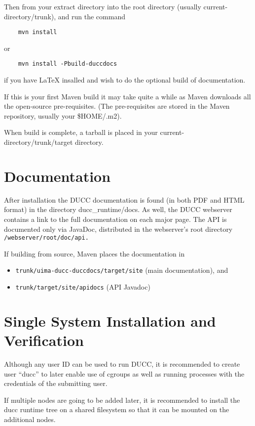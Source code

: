 Then from your extract directory into
the root directory (usually current-directory/trunk), and run the command
\begin{verbatim}
    mvn install
\end{verbatim}
or
\begin{verbatim}
    mvn install -Pbuild-duccdocs
\end{verbatim}
if you have LaTeX insalled and wish to do the optional build of documentation.

If this is your first Maven build it may take quite a while as Maven downloads all the
open-source pre-requisites.  (The pre-requisites are stored in the Maven repository, usually
your \$HOME/.m2).

When build is complete, a tarball is placed in your current-directory/trunk/target
directory.

\section{Documentation}
\begin{sloppypar}
After installation the DUCC documentation is found (in both PDF and HTML format) in the directory 
ducc\_runtime/docs.  As well, the DUCC webserver contains a link to the full documentation on each major page.
The API is documented only via JavaDoc, distributed in the webserver's root directory 
{\tt \duccruntime/webserver/root/doc/api.}  
\end{sloppypar}

If building from source, Maven places the documentation in
\begin{itemize}
    \item {\tt trunk/uima-ducc-duccdocs/target/site} (main documentation), and 
    \item {\tt trunk/target/site/apidocs} (API Javadoc)
\end{itemize}

\section{Single System Installation and Verification}

Although any user ID can be used to run DUCC, it is recommended to create user ``ducc''
to later enable use of cgroups as well as running processes with the credentials of the submitting user.

If multiple nodes are going to be added later, it is recommended to install the ducc runtime tree
on a shared filesystem so that it can be mounted on the additional nodes.

